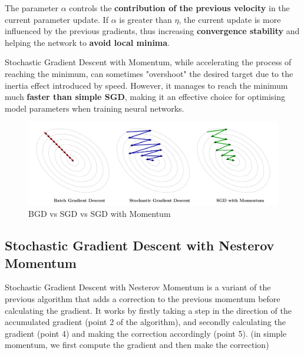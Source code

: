 The parameter \(\alpha\) controls the \textbf{\textcolor{mybluee}{contribution of the previous velocity}} in the current parameter update. If \(\alpha\) is greater than \(\eta\), the current update is more influenced by the previous gradients, thus increasing \textbf{convergence stability} and helping the network to \textbf{avoid local minima}. 

Stochastic Gradient Descent with Momentum, while accelerating the process of reaching the minimum, can sometimes "overshoot" the desired target due to the inertia effect introduced by speed. However, it manages to reach the minimum much \textbf{faster than simple SGD}, making it an effective choice for optimising model parameters when training neural networks.


\begin{figure}[htbp]
\centering
\includegraphics[width=\textwidth]{tikz/chapter3 - BGD vs SGD vs SGD with Momentum.pdf}
\caption{BGD vs SGD vs SGD with Momentum}
\end{figure}

\subsection{Stochastic Gradient Descent with Nesterov Momentum}

Stochastic Gradient Descent with Nesterov Momentum is a variant of the previous algorithm that adds a correction to the previous momentum before calculating the gradient. It works by firstly taking a step in the direction of the accumulated gradient (point 2 of the algorithm), and secondly calculating the gradient (point 4) and making the correction accordingly (point 5). (in simple momentum, we first compute the gradient and then make the correction) 

